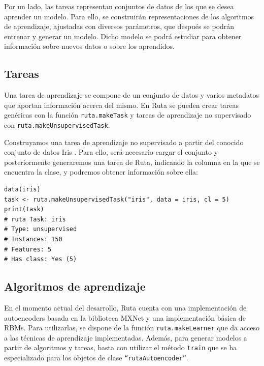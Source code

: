 Por un lado, las tareas representan conjuntos de datos de los que se desea aprender un modelo. Para ello, se construirán representaciones de los algoritmos de aprendizaje, ajustadas con diversos parámetros, que después se podrán entrenar y generar un modelo. Dicho modelo se podrá estudiar para obtener información sobre nuevos datos o sobre los aprendidos.

\subsection{Tareas}

Una tarea de aprendizaje se compone de un conjunto de datos y varios metadatos que aportan información acerca del mismo. En Ruta se pueden crear tareas genéricas con la función \texttt{ruta.makeTask} y tareas de aprendizaje no supervisado con \texttt{ruta.makeUnsupervisedTask}.

\begin{example}
  Construyamos una tarea de aprendizaje no supervisado a partir del conocido conjunto de datos Iris \autocite{fisher1936iris}. Para ello, será necesario cargar el conjunto y posteriormente generaremos una tarea de Ruta, indicando la columna en la que se encuentra la clase, y podremos obtener información sobre ella:
  \begin{lstlisting}
data(iris)
task <- ruta.makeUnsupervisedTask("iris", data = iris, cl = 5)
print(task)
# ruta Task: iris
# Type: unsupervised
# Instances: 150
# Features: 5
# Has class: Yes (5)
  \end{lstlisting}
\end{example}

\subsection{Algoritmos de aprendizaje}

En el momento actual del desarrollo, Ruta cuenta con una implementación de autoencoders basada en la biblioteca MXNet y una implementación básica de RBMs. Para utilizarlas, se dispone de la función \texttt{ruta.makeLearner} que da acceso a las técnicas de aprendizaje implementadas. Además, para generar modelos a partir de algoritmos y tareas, basta con utilizar el método \texttt{train} que se ha especializado para los objetos de clase \texttt{``rutaAutoencoder''}.

